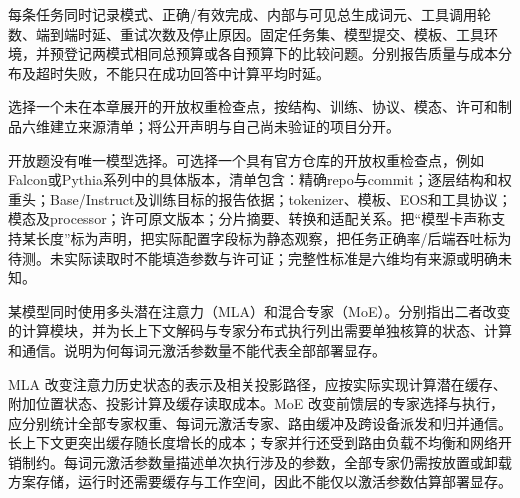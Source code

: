 \begin{exercises}
\begin{exercise}
\begin{solution}
每条任务同时记录模式、正确/有效完成、内部与可见总生成词元、工具调用轮数、端到端时延、重试次数及停止原因。固定任务集、模型提交、模板、工具环境，并预登记两模式相同总预算或各自预算下的比较问题。分别报告质量与成本分布及超时失败，不能只在成功回答中计算平均时延。
\end{solution}
\end{exercise}

\begin{exercise}\optional 选择一个未在本章展开的开放权重检查点，按结构、训练、协议、模态、许可和制品六维建立来源清单；将公开声明与自己尚未验证的项目分开。

\begin{solution}
开放题没有唯一模型选择。可选择一个具有官方仓库的开放权重检查点，例如Falcon或Pythia系列中的具体版本，清单包含：精确repo与commit；逐层结构和权重头；Base/Instruct及训练目标的报告依据；tokenizer、模板、EOS和工具协议；模态及processor；许可原文版本；分片摘要、转换和适配关系。把“模型卡声称支持某长度”标为声明，把实际配置字段标为静态观察，把任务正确率/后端吞吐标为待测。未实际读取时不能填造参数与许可证；完整性标准是六维均有来源或明确未知。
\end{solution}
\end{exercise}

\begin{exercise} 某模型同时使用多头潜在注意力（MLA）和混合专家（MoE）。分别指出二者改变的计算模块，并为长上下文解码与专家分布式执行列出需要单独核算的状态、计算和通信。说明为何每词元激活参数量不能代表全部部署显存。

\begin{solution}
MLA 改变注意力历史状态的表示及相关投影路径，应按实际实现计算潜在缓存、附加位置状态、投影计算及缓存读取成本。MoE 改变前馈层的专家选择与执行，应分别统计全部专家权重、每词元激活专家、路由缓冲及跨设备派发和归并通信。长上下文更突出缓存随长度增长的成本；专家并行还受到路由负载不均衡和网络开销制约。每词元激活参数量描述单次执行涉及的参数，全部专家仍需按放置或卸载方案存储，运行时还需要缓存与工作空间，因此不能仅以激活参数估算部署显存。
\end{solution}
\end{exercise}

\end{exercises}
